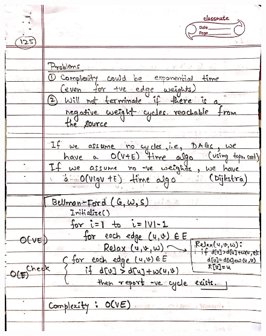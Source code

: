 \begin{figure}[H]
    \centering
    \includegraphics[scale=0.25]{"./MIT-6.006/MIT-6006-125"}
\end{figure}
\newpage
